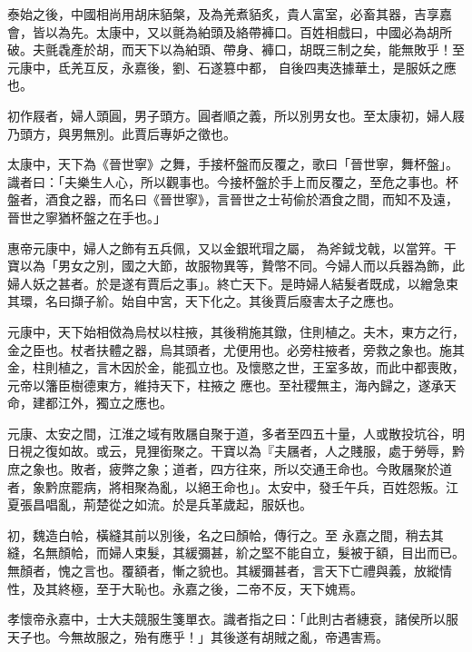 \begin{pinyinscope}
 泰始之後，中國相尚用胡床貊槃，及為羌煮貊炙，貴人富室，必畜其器，吉享嘉會，皆以為先。太康中，又以氈為絈頭及絡帶褲口。百姓相戲曰，中國必為胡所破。夫氈毳產於胡，而天下以為絈頭、帶身、褲口，胡既三制之矣，能無敗乎！至元康中，氐羌互反，永嘉後，劉、石遂篡中都，
 自後四夷迭據華土，是服妖之應也。



 初作屐者，婦人頭圓，男子頭方。圓者順之義，所以別男女也。至太康初，婦人屐乃頭方，與男無別。此賈后專妒之徵也。



 太康中，天下為《晉世寧》之舞，手接杯盤而反覆之，歌曰「晉世寧，舞杯盤」。識者曰：「夫樂生人心，所以觀事也。今接杯盤於手上而反覆之，至危之事也。杯盤者，酒食之器，而名曰《晉世寧》，言晉世之士茍偷於酒食之間，而知不及遠，晉世之寧猶杯盤之在手也。」



 惠帝元康中，婦人之飾有五兵佩，又以金銀玳瑁之屬，
 為斧鉞戈戟，以當笄。干寶以為「男女之別，國之大節，故服物異等，贄幣不同。今婦人而以兵器為飾，此婦人妖之甚者。於是遂有賈后之事」。終亡天下。是時婦人結髮者既成，以繒急束其環，名曰擷子紒。始自中宮，天下化之。其後賈后廢害太子之應也。



 元康中，天下始相傚為烏杖以柱掖，其後稍施其鐓，住則植之。夫木，東方之行，金之臣也。杖者扶體之器，烏其頭者，尤便用也。必旁柱掖者，旁救之象也。施其金，柱則植之，言木因於金，能孤立也。及懷愍之世，王室多故，而此中都喪敗，元帝以籓臣樹德東方，維持天下，柱掖之
 應也。至社稷無主，海內歸之，遂承天命，建都江外，獨立之應也。



 元康、太安之間，江淮之域有敗屩自聚于道，多者至四五十量，人或散投坑谷，明日視之復如故。或云，見狸銜聚之。干寶以為『夫屩者，人之賤服，處于勞辱，黔庶之象也。敗者，疲弊之象；道者，四方往來，所以交通王命也。今敗屩聚於道者，象黔庶罷病，將相聚為亂，以絕王命也」。太安中，發壬午兵，百姓怨叛。江夏張昌唱亂，荊楚從之如流。於是兵革歲起，服妖也。



 初，魏造白帢，橫縫其前以別後，名之曰顏帢，傳行之。至
 永嘉之間，稍去其縫，名無顏帢，而婦人束髮，其緩彌甚，紒之堅不能自立，髮被于額，目出而已。無顏者，愧之言也。覆額者，慚之貌也。其緩彌甚者，言天下亡禮與義，放縱情性，及其終極，至于大恥也。永嘉之後，二帝不反，天下媿焉。



 孝懷帝永嘉中，士大夫競服生箋單衣。識者指之曰：「此則古者繐衰，諸侯所以服天子也。今無故服之，殆有應乎！」其後遂有胡賊之亂，帝遇害焉。




\end{pinyinscope}
